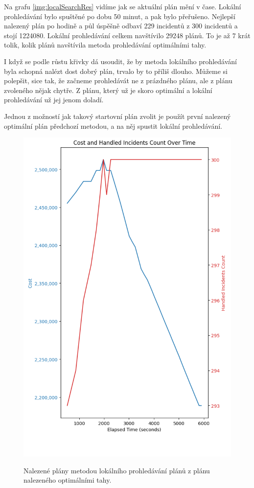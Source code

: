 Na grafu \ref{img:localSearchRes} vidíme jak se aktuální plán mění v čase.
Lokální prohledávání bylo spuštěné po dobu 50 minut, a pak bylo přeřušeno. 
Nejlepší nalezený plán po hodině a půl úspěšně odbaví 229 incidentů z 300 incidentů a stojí 1224080.
Lokální prohledávání celkem navštívilo 29248 plánů. To je až 7 krát tolik, kolik plánů navštívila metoda prohledávání optimálními tahy.

I když se podle růstu křivky dá usoudit, že by metoda lokálního prohledávání byla schopná nalézt dost dobrý plán, trvalo by to příliš dlouho.
Můžeme si polepšit, sice tak, že začneme prohledávát ne z prázdného plánu, ale z plánu zvoleného nějak chytře.
Z plánu, který už je skoro optimální a lokální prohledávání už jej jenom doladí.

Jednou z možností jak takový startovní plán zvolit je použít první nalezený optimální plán předchozí metodou, a na něj spustit lokální prohledávání.

\begin{figure}[H]
  \caption{Nalezené plány metodou lokálního prohledávání plánů z plánu nalezeného optimálními tahy.}
  \includegraphics[width=\textwidth]{img/plots/localSearch_fromOptimal.png}
  \centering
  \label{img:hybrid}
\end{figure}

